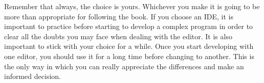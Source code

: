 Remember that always, the choice is yours. Whichever you make it is going to be more than appropriate for following the book. If you choose an IDE, it is important to practice before starting to develop a complex program in order to clear all the doubts you may face when dealing with the editor. It is also important to stick with your choice for a while. Once you start developing with one editor, you should use it for a long time before changing to another. This is the only way in which you can really appreciate the differences and make an informed decision. 

